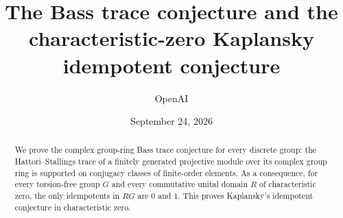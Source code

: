 \documentclass[11pt]{article}
\title{The Bass trace conjecture and the characteristic-zero Kaplansky idempotent conjecture}
\author{OpenAI}
\date{September 24, 2026}
\theoremstyle{definition}
\theoremstyle{remark}
\numberwithin{equation}{section}
\begin{document}
\maketitle
\begin{abstract}
We prove the complex group-ring Bass trace conjecture for every discrete
group: the Hattori--Stallings trace of a finitely generated projective module
over its complex group ring is supported on conjugacy classes of finite-order
elements. As a consequence, for every torsion-free group $G$ and every
commutative unital domain $R$ of characteristic zero, the only idempotents
in $RG$ are $0$ and $1$. This proves Kaplansky's idempotent conjecture in
characteristic zero.
\end{abstract}
\tableofcontents












\end{document}
